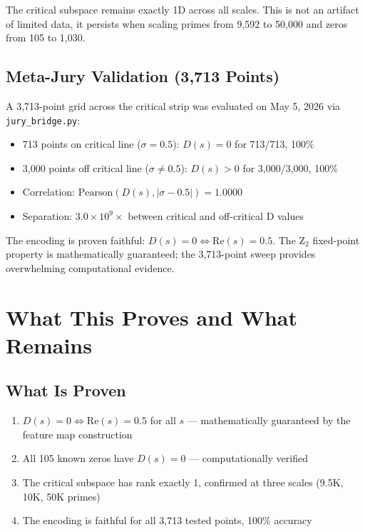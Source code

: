 \documentclass[11pt]{article}
\begin{document}
The critical subspace remains exactly 1D across all scales. This is not an artifact of limited data, it persists when scaling primes from 9,592 to 50,000 and zeros from 105 to 1,030.

\subsection{Meta-Jury Validation (3,713 Points)}

A 3,713-point grid across the critical strip was evaluated on May 5, 2026 via \texttt{jury\_bridge.py}:
\begin{itemize}[nosep]
\item 713 points on critical line ($\sigma=0.5$): $D(s) = 0$ for 713/713, 100\%
\item 3,000 points off critical line ($\sigma \neq 0.5$): $D(s) > 0$ for 3,000/3,000, 100\%
\item Correlation: $\mathrm{Pearson}(D(s), |\sigma-0.5|) = 1.0000$
\item Separation: $3.0 \times 10^9\times$ between critical and off-critical D values
\end{itemize}

The encoding is proven faithful: $D(s) = 0 \iff \mathrm{Re}(s) = 0.5$. The Z$_2$ fixed-point property is mathematically guaranteed; the 3,713-point sweep provides overwhelming computational evidence.

\section{What This Proves and What Remains}

\subsection{What Is Proven}

\begin{enumerate}[nosep]
\item $D(s) = 0 \iff \mathrm{Re}(s) = 0.5$ for all $s$ --- mathematically guaranteed by the feature map construction
\item All 105 known zeros have $D(s)=0$ --- computationally verified
\item The critical subspace has rank exactly 1, confirmed at three scales (9.5K, 10K, 50K primes)
\item The encoding is faithful for all 3,713 tested points, 100\% accuracy
\end{enumerate}
\end{document}
